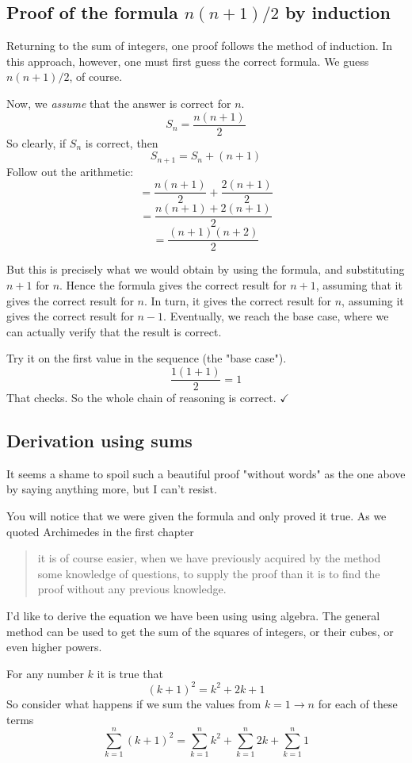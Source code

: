 \documentclass[11pt, oneside]{article}
\begin{document}
\subsection*{Proof of the formula $n(n+1)/2$ by induction}

Returning to the sum of integers, one proof follows the method of induction.  In this approach, however, one must first guess the correct formula.  We guess $n(n+1)/2$, of course.  

Now, we \emph{assume} that the answer is correct for $n$.
\[ S_n = \frac{n(n+1)}{2} \]
So clearly, if $S_n$ is correct, then
\[ S_{n+1} = S_n + (n + 1) \]
Follow out the arithmetic:
\[ = \frac{n(n+1)}{2} + \frac{2(n+1)}{2} \]
\[ = \frac{n(n+1) + 2(n+1)}{2} \]
\[ = \frac{(n+1)(n+2)}{2} \]

But this is precisely what we would obtain by using the formula, and substituting $n+1$ for $n$.  Hence the formula gives the correct result for $n+1$, assuming that it gives the correct result for $n$.  In turn, it gives the correct result for $n$, assuming it gives the correct result for $n-1$.  Eventually, we reach the base case, where we can actually verify that the result is correct.

Try it on the first value in the sequence (the "base case").
\[ \frac{1(1+1)}{2} = 1 \]
That checks.  So the whole chain of reasoning is correct.  $\checkmark$

\subsection*{Derivation using sums}
It seems a shame to spoil such a beautiful proof "without words" as the one above by saying anything more, but I can't resist.  

You will notice that we were given the formula and only proved it true.  As we quoted Archimedes in the first chapter

\begin{quote}it is of course easier, when we have previously acquired by the method some knowledge of questions, to supply the proof than it is to find the proof without any previous knowledge.\end{quote}

I'd like to derive the equation we have been using using algebra.  The general method can be used to get the sum of the squares of integers, or their cubes, or even higher powers.

For any number $k$ it is true that
\[ (k+1)^2 = k^2 + 2k + 1 \]
So consider what happens if we sum the values from $k=1 \rightarrow n$ for each of these terms
\[ \sum_{k=1}^n (k+1)^2 = \sum_{k=1}^n k^2 + \sum_{k=1}^n 2k + \sum_{k=1}^n 1 \]
\end{document}
